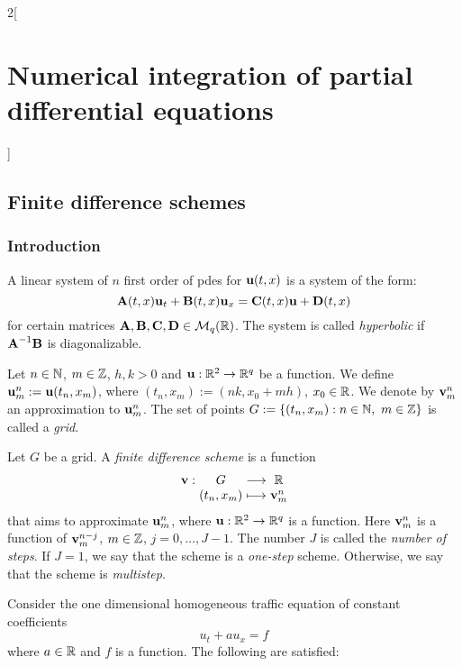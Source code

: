 \documentclass[../../../main_math.tex]{subfiles}
\begin{document}
\begin{multicols}{2}[\section{Numerical integration of partial differential equations}]
  \subsection{Finite difference schemes}
  \subsubsection{Introduction}
  \begin{definition}
    A linear system of $n$ first order of pdes for $\boldsymbol{\mathrm{u}}(t,x)$ is a system of the form: $$\boldsymbol{\mathrm{A}}(t,x)\boldsymbol{\mathrm{u}}_t+\boldsymbol{\mathrm{B}}(t,x)\boldsymbol{\mathrm{u}}_x=\boldsymbol{\mathrm{C}}(t,x)\boldsymbol{\mathrm{u}}+\boldsymbol{\mathrm{D}}(t,x)$$
    for certain matrices $\boldsymbol{\mathrm{A}},\boldsymbol{\mathrm{B}},\boldsymbol{\mathrm{C}}, \boldsymbol{\mathrm{D}}\in \mathcal{M}_q(\mathbb{R})$. The system is called \emph{hyperbolic} if $\boldsymbol{\mathrm{A}}^{-1}\boldsymbol{\mathrm{B}}$ is diagonalizable.
  \end{definition}
  \begin{definition}
    Let $n\in\mathbb{N}$, $m\in\mathbb{Z}$, $h,k>0$ and $\boldsymbol{\mathrm{u}}:\mathbb{R}^2\rightarrow\mathbb{R}^q$ be a function. We define $\boldsymbol{\mathrm{u}}_m^n:=\boldsymbol{\mathrm{u}}(t_n,x_m)$, where $(t_n, x_m):=(nk,x_0+mh)$, $x_0\in\mathbb{R}$. We denote by $\boldsymbol{\mathrm{v}}_m^n$ an approximation to $\boldsymbol{\mathrm{u}}_m^n$. The set of points $G:=\{(t_n,x_m):n\in\mathbb{N},\ m\in\mathbb{Z}\}$ is called a \emph{grid}.
  \end{definition}
  \begin{definition}
    Let $G$ be a grid. A \emph{finite difference scheme} is a function $$\function{\vf{v}}{G}{\RR}{(t_n,x_m)}{\vf{v}_m^n}$$
    that aims to approximate $\boldsymbol{\mathrm{u}}_m^n$, where $\boldsymbol{\mathrm{u}}:\mathbb{R}^2\rightarrow\mathbb{R}^q$ is a function. Here $\boldsymbol{\mathrm{v}}_m^n$ is a function of $\boldsymbol{\mathrm{v}}_m^{n-j}$, $m\in\mathbb{Z}$, $j=0,\ldots,J-1$. The number $J$ is called the \emph{number of steps}. If $J=1$, we say that the scheme is a \emph{one-step} scheme. Otherwise, we say that the scheme is \emph{multistep}.
  \end{definition}
  \begin{proposition}
    Consider the one dimensional homogeneous traffic equation of constant coefficients
    \begin{equation}\label{NIPDE:traffic}
      u_t+au_x=f
    \end{equation}
    where $a\in\mathbb{R}$ and $f$ is a function.
    The following are satisfied:
    \begin{enumerate}

\end{enumerate}
\end{proposition}
\end{multicols}
\end{document}

